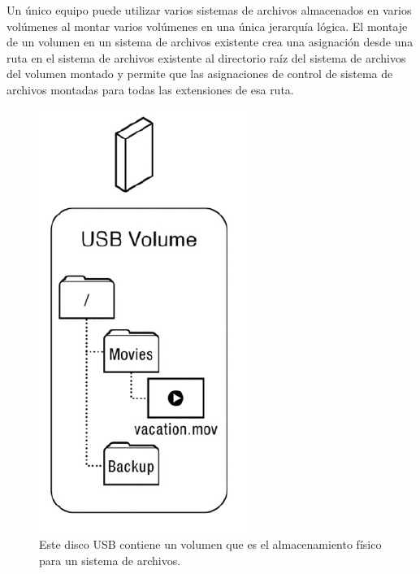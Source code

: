 \documentclass[10pt]{book}
\begin{document}
Un único equipo puede utilizar varios sistemas de archivos almacenados en varios volúmenes al montar varios volúmenes en una única jerarquía lógica. El montaje de un volumen en un sistema de archivos existente crea una asignación desde una ruta en el sistema de archivos existente al directorio raíz del sistema de archivos del volumen montado y permite que las asignaciones de control de sistema de archivos montadas para todas las extensiones de esa ruta.


\begin{figure}[tbhp]
\centerline{\includegraphics[scale=0.70]{img/fig1101}}
\caption{Este disco USB contiene un volumen que es el almacenamiento físico para un sistema de archivos.}
\label{fig1101}
\end{figure}
\end{document}
